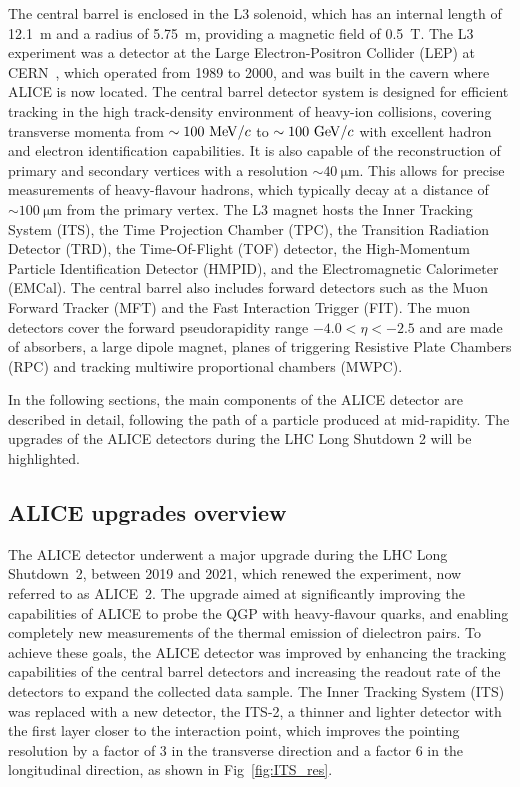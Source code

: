 The central barrel is enclosed in the L3 solenoid, which has an internal length of 12.1~m and a radius of 5.75~m, providing a magnetic field of 0.5~T. The L3 experiment was a detector at the Large Electron-Positron Collider (LEP) at CERN~\cite{Myers:1991ym}, which operated from 1989 to 2000, and was built in the cavern where ALICE is now located. The central barrel detector system is designed for efficient tracking in the high track-density environment of heavy-ion collisions, covering transverse momenta from $\sim100~\mathrm{Me\kern-.1emV}/c$ to $\sim100~\mathrm{Ge\kern-.1emV}/c$ with excellent hadron and electron identification capabilities. It is also capable of the reconstruction of primary and secondary vertices with a resolution $\sim\SI{40}{\micro\meter}$. This allows for precise measurements of heavy-flavour hadrons, which typically decay at a distance of $\sim\SI{100}{\micro\meter}$ from the primary vertex. The L3 magnet hosts the Inner Tracking System (ITS), the Time Projection Chamber (TPC), the Transition Radiation Detector (TRD), the Time-Of-Flight (TOF) detector, the High-Momentum Particle Identification Detector (HMPID), and the Electromagnetic Calorimeter (EMCal). The central barrel also includes forward detectors such as the Muon Forward Tracker (MFT) and the Fast Interaction Trigger (FIT). The muon detectors cover the forward pseudorapidity range $-4.0 < \eta < -2.5$ and are made of absorbers, a large dipole magnet, planes of triggering Resistive Plate Chambers (RPC) and tracking multiwire proportional chambers (MWPC).

In the following sections, the main components of the ALICE detector are described in detail, following the path of a particle produced at mid-rapidity. The upgrades of the ALICE detectors during the LHC Long Shutdown 2 will be highlighted.

\subsection{ALICE upgrades overview}
The ALICE detector underwent a major upgrade during the LHC Long Shutdown~2, between 2019 and 2021, which renewed the experiment, now referred to as ALICE~2. The upgrade aimed at significantly improving the capabilities of ALICE to probe the QGP with heavy-flavour quarks, and enabling completely new measurements of the thermal emission of dielectron pairs. To achieve these goals, the ALICE detector was improved by enhancing the tracking capabilities of the central barrel detectors and increasing the readout rate of the detectors to expand the collected data sample. The Inner Tracking System (ITS) was replaced with a new detector, the ITS-2, a thinner and lighter detector with the first layer closer to the interaction point, which improves the pointing resolution by a factor of 3 in the transverse direction and a factor 6 in the longitudinal direction, as shown in Fig~\ref{fig:ITS_res}.

